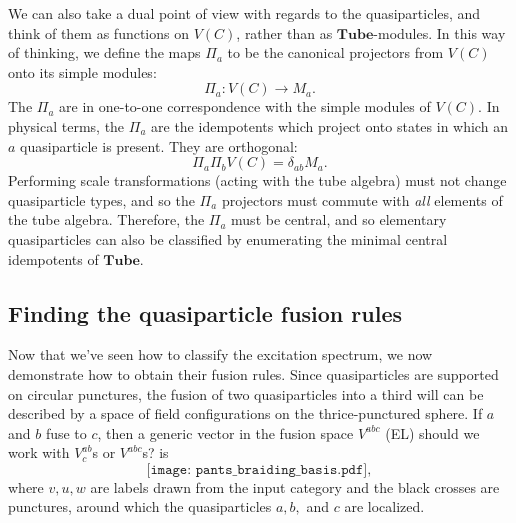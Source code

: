 \documentclass[12pt,a4paper]{article}
\newcounter{arrow}
\newcommand\be            {\begin{equation}}
\newcommand\ee            {\end{equation}}
\newcommand{\fube}{\textbf{Tube}}
\newcommand{\tube}{\textbf{Tube}}
\newcommand{\fld}{\mathcal{F}} %
\newcommand{\ethan}[1]{{\color{amethyst}\footnotesize{(EL) #1}}}
\begin{document}


We can also take a dual point of view with regards to the quasiparticles, and think of them as functions on $V(C)$, rather than as $\tube$-modules. In this way of thinking, we define the maps $\Pi_a$ to be the canonical projectors from $V(C)$ onto its simple modules:
\be \Pi_a : V(C) \rightarrow M_a.\ee
The $\Pi_a$ are in one-to-one correspondence with the simple modules of $V(C)$. In physical terms, the $\Pi_a$ are the idempotents which project onto states in which an $a$ quasiparticle is present. They are orthogonal:
\be \Pi_a \Pi_b V(C) = \delta_{ab}M_a.\ee
Performing scale transformations (acting with the tube algebra) must not change quasiparticle types, and so the $\Pi_a$ projectors must commute with {\it all} elements of the tube algebra. Therefore, the $\Pi_a$ must be central, and so elementary quasiparticles can also be classified by enumerating the minimal central idempotents of $\tube$. 


\subsection{Finding the quasiparticle fusion rules}

Now that we've seen how to classify the excitation spectrum, we now demonstrate how to obtain their fusion rules. Since quasiparticles are supported on circular punctures, the fusion of two quasiparticles into a third will can be described by a space of field configurations on the thrice-punctured sphere. If $a$ and $b$ fuse to $c$, then a generic vector in the fusion space $V^{abc}$ \ethan{should we work with $V^{ab}_c$s or $V^{abc}$s?} is 
\be \label{pants_braiding_basis} \texttt{[image: pants\_braiding\_basis.pdf]},\ee
where $v,u,w$ are labels drawn from the input category and the black crosses are punctures, around which the quasiparticles $a,b,$ and $c$ are localized. 
\end{document}
